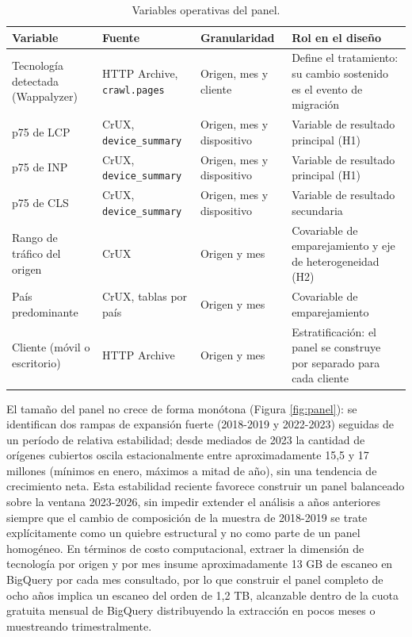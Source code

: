 \documentclass[12pt, a4paper]{article}
\begin{document}
\begin{table}[htbp]
\centering
\small
\caption{Variables operativas del panel.}
\label{tab:variables}
\begin{tabular}{|p{3.3cm}|p{3.2cm}|p{2.6cm}|p{4.1cm}|}
\hline
\textbf{Variable} & \textbf{Fuente} & \textbf{Granularidad} & \textbf{Rol en el diseño} \\ \hline
Tecnología detectada (Wappalyzer) & HTTP Archive, \texttt{crawl.pages} & Origen, mes y cliente & Define el tratamiento: su cambio sostenido es el evento de migración \\ \hline
p75 de LCP & CrUX, \texttt{device\_summary} & Origen, mes y dispositivo & Variable de resultado principal (H1) \\ \hline
p75 de INP & CrUX, \texttt{device\_summary} & Origen, mes y dispositivo & Variable de resultado principal (H1) \\ \hline
p75 de CLS & CrUX, \texttt{device\_summary} & Origen, mes y dispositivo & Variable de resultado secundaria \\ \hline
Rango de tráfico del origen & CrUX & Origen y mes & Covariable de emparejamiento y eje de heterogeneidad (H2) \\ \hline
País predominante & CrUX, tablas por país & Origen y mes & Covariable de emparejamiento \\ \hline
Cliente (móvil o escritorio) & HTTP Archive & Origen y mes & Estratificación: el panel se construye por separado para cada cliente \\ \hline
\end{tabular}
\end{table}

El tamaño del panel no crece de forma monótona (Figura \ref{fig:panel}): se identifican dos rampas de expansión fuerte (2018-2019 y 2022-2023) seguidas de un período de relativa estabilidad; desde mediados de 2023 la cantidad de orígenes cubiertos oscila estacionalmente entre aproximadamente 15,5 y 17 millones (mínimos en enero, máximos a mitad de año), sin una tendencia de crecimiento neta. Esta estabilidad reciente favorece construir un panel balanceado sobre la ventana 2023-2026, sin impedir extender el análisis a años anteriores siempre que el cambio de composición de la muestra de 2018-2019 se trate explícitamente como un quiebre estructural y no como parte de un panel homogéneo. En términos de costo computacional, extraer la dimensión de tecnología por origen y por mes insume aproximadamente 13 GB de escaneo en BigQuery por cada mes consultado, por lo que construir el panel completo de ocho años implica un escaneo del orden de 1,2 TB, alcanzable dentro de la cuota gratuita mensual de BigQuery distribuyendo la extracción en pocos meses o muestreando trimestralmente.
\end{document}

